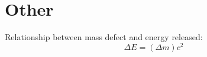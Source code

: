 \documentclass[10pt]{article}
\begin{document}

\section{Other}

Relationship between mass defect and energy released: 
\begin{equation*}
\Delta E = (\Delta m)c^2
\end{equation*}
\end{document}
